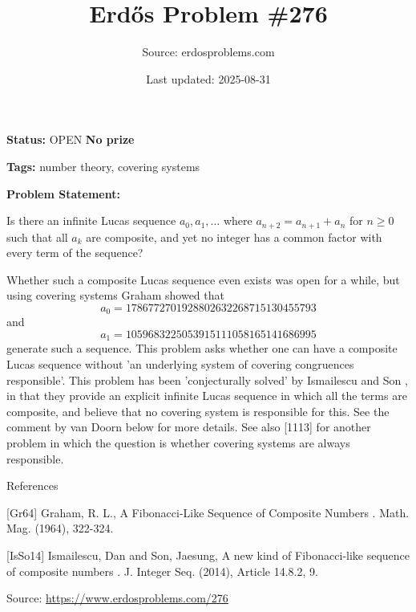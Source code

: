 \documentclass{article}
\title{Erd\H{o}s Problem \#276}
\date{Last updated: 2025-08-31}
\author{Source: erdosproblems.com}
\begin{document}
\maketitle

\noindent\textbf{Status:} OPEN \quad \textbf{No prize}

\noindent\textbf{Tags:} number theory, covering systems

\medskip

\noindent\textbf{Problem Statement:}

Is there an infinite Lucas sequence $a_0,a_1,\ldots$ where $a_{n+2}=a_{n+1}+a_n$ for $n\geq 0$ such that all $a_k$ are composite, and yet no integer has a common factor with every term of the sequence?




Whether such a composite Lucas sequence even exists was open for a while, but using covering systems Graham \cite{Gr64} showed that\[a_0 = 1786772701928802632268715130455793\]and\[a_1 = 1059683225053915111058165141686995\]generate such a sequence. This problem asks whether one can have a composite Lucas sequence without 'an underlying system of covering congruences responsible'. This problem has been 'conjecturally solved' by Ismailescu and Son \cite{IsSo14}, in that they provide an explicit infinite Lucas sequence in which all the terms are composite, and believe that no covering system is responsible for this. See the comment by van Doorn below for more details. See also [1113] for another problem in which the question is whether covering systems are always responsible.




References

[Gr64] Graham, R. L., A Fibonacci-Like Sequence of Composite Numbers . Math. Mag. (1964), 322-324.

[IsSo14] Ismailescu, Dan and Son, Jaesung, A new kind of {F}ibonacci-like sequence of composite numbers . J. Integer Seq. (2014), Article 14.8.2, 9.


\bigskip
\noindent\small{Source: \url{https://www.erdosproblems.com/276}}
\end{document}
